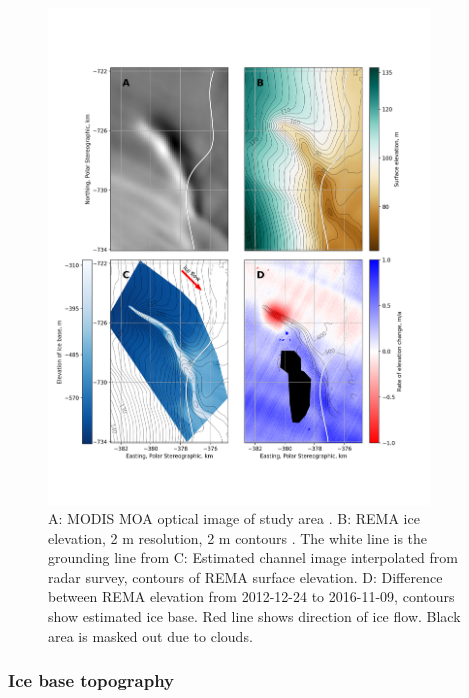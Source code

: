 \begin{figure}[!ht]
\centering
\includegraphics[width=0.9\textwidth]{chapters/2/4square_channel.png}
\caption[Channel observations]{A: MODIS MOA optical image of study area \citep{haran2014modis}. B: REMA ice elevation, 2 m resolution, 2 m contours \citep{howat2019reference}. The white line is the grounding line from \cite{depoorter2013amii} C: Estimated channel image interpolated from radar survey, contours of REMA surface elevation.  D: Difference between REMA elevation from 2012-12-24 to 2016-11-09, contours show estimated ice base.  Red line shows direction of ice flow. Black area is masked out due to clouds.}
\label{fig:4square_channel}
\end{figure}  

\subsubsection{Ice base topography} \label{sec:icebasetopog}

